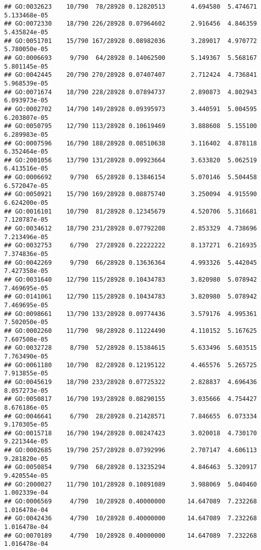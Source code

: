 \documentclass[
]{article}
\begin{document}
\begin{verbatim}
## GO:0032623    10/790  78/28928 0.12820513       4.694580  5.474671 5.133468e-05
## GO:0072330    18/790 226/28928 0.07964602       2.916456  4.846359 5.435824e-05
## GO:0051701    15/790 167/28928 0.08982036       3.289017  4.970772 5.780050e-05
## GO:0006693     9/790  64/28928 0.14062500       5.149367  5.568167 5.801145e-05
## GO:0042445    20/790 270/28928 0.07407407       2.712424  4.736841 5.968539e-05
## GO:0071674    18/790 228/28928 0.07894737       2.890873  4.802943 6.093973e-05
## GO:0002702    14/790 149/28928 0.09395973       3.440591  5.004595 6.203807e-05
## GO:0050795    12/790 113/28928 0.10619469       3.888608  5.155100 6.289983e-05
## GO:0007596    16/790 188/28928 0.08510638       3.116402  4.878118 6.352464e-05
## GO:2001056    13/790 131/28928 0.09923664       3.633820  5.062519 6.413516e-05
## GO:0006692     9/790  65/28928 0.13846154       5.070146  5.504458 6.572047e-05
## GO:0050921    15/790 169/28928 0.08875740       3.250094  4.915590 6.624200e-05
## GO:0016101    10/790  81/28928 0.12345679       4.520706  5.316681 7.120787e-05
## GO:0034612    18/790 231/28928 0.07792208       2.853329  4.738696 7.213496e-05
## GO:0032753     6/790  27/28928 0.22222222       8.137271  6.216935 7.374836e-05
## GO:0042269     9/790  66/28928 0.13636364       4.993326  5.442045 7.427358e-05
## GO:0031640    12/790 115/28928 0.10434783       3.820980  5.078942 7.469695e-05
## GO:0141061    12/790 115/28928 0.10434783       3.820980  5.078942 7.469695e-05
## GO:0098661    13/790 133/28928 0.09774436       3.579176  4.995361 7.502050e-05
## GO:0002260    11/790  98/28928 0.11224490       4.110152  5.167625 7.607508e-05
## GO:0032728     8/790  52/28928 0.15384615       5.633496  5.603515 7.763490e-05
## GO:0061180    10/790  82/28928 0.12195122       4.465576  5.265725 7.913855e-05
## GO:0045619    18/790 233/28928 0.07725322       2.828837  4.696436 8.057273e-05
## GO:0050817    16/790 193/28928 0.08290155       3.035666  4.754427 8.676186e-05
## GO:0046641     6/790  28/28928 0.21428571       7.846655  6.073334 9.170305e-05
## GO:0015718    16/790 194/28928 0.08247423       3.020018  4.730170 9.221344e-05
## GO:0002685    19/790 257/28928 0.07392996       2.707147  4.606113 9.281820e-05
## GO:0050854     9/790  68/28928 0.13235294       4.846463  5.320917 9.420554e-05
## GO:2000027    11/790 101/28928 0.10891089       3.988069  5.040460 1.002339e-04
## GO:0006569     4/790  10/28928 0.40000000      14.647089  7.232268 1.016478e-04
## GO:0042436     4/790  10/28928 0.40000000      14.647089  7.232268 1.016478e-04
## GO:0070189     4/790  10/28928 0.40000000      14.647089  7.232268 1.016478e-04

\end{verbatim}
\end{document}
